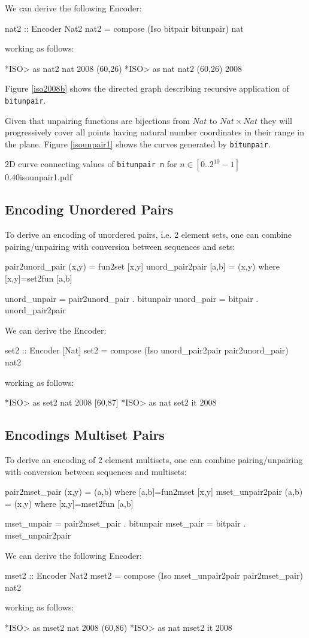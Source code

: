 \documentclass[]{INCLUDES/llncs}
\begin{document}
We can derive the following Encoder:
\begin{code}
nat2 :: Encoder Nat2
nat2 = compose (Iso bitpair bitunpair) nat
\end{code}
working as follows:
\begin{codex}
*ISO> as nat2 nat 2008
(60,26)
*ISO> as nat nat2 (60,26)
2008
\end{codex}

Figure \ref{iso2008b} shows the
directed graph describing recursive application of {\tt bitunpair}.


Given that unpairing functions are bijections from $Nat$ to $Nat \times Nat$
they will progressively cover all points having natural number coordinates in
their range in the plane. Figure \ref{isounpair1}
shows the curves generated by {\tt bitunpair}.

{2D curve connecting values of {\tt bitunpair n} for $n \in [0..2^{10}-1]$}
{0.40}{isounpair1.pdf}

\subsection{Encoding Unordered Pairs}
To derive an encoding of unordered pairs, i.e. 2 element sets, one
can combine pairing/unpairing with conversion between sequences and
sets:
\begin{code}
pair2unord_pair (x,y) = fun2set [x,y]
unord_pair2pair [a,b] = (x,y) where 
  [x,y]=set2fun [a,b]   

unord_unpair = pair2unord_pair . bitunpair
unord_pair = bitpair . unord_pair2pair
\end{code}
We can derive the Encoder:
\begin{code}
set2 :: Encoder [Nat]
set2 = compose (Iso unord_pair2pair pair2unord_pair) nat2
\end{code}
working as follows:
\begin{codex}
*ISO> as set2 nat 2008
[60,87]
*ISO> as nat set2 it
2008
\end{codex}

\subsection{Encodings Multiset Pairs}
To derive an encoding of 2 element multisets, one
can combine pairing/unpairing with conversion between sequences and
multisets:
\begin{code}
pair2mset_pair (x,y) = (a,b) where [a,b]=fun2mset [x,y]
mset_unpair2pair (a,b) = (x,y) where [x,y]=mset2fun [a,b]

mset_unpair = pair2mset_pair . bitunpair
mset_pair = bitpair . mset_unpair2pair
\end{code}
We can derive the following Encoder:
\begin{code}
mset2 :: Encoder Nat2
mset2 = compose (Iso mset_unpair2pair pair2mset_pair) nat2
\end{code}
working as follows:
\begin{codex}
*ISO> as mset2 nat 2008
(60,86)
*ISO> as nat mset2 it
2008
\end{codex}
\end{document}
